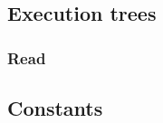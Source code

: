 \documentclass[11pt]{article}
\begin{document}
\hypertarget{execution-trees}{%
\subsection{Execution trees}\label{execution-trees}}

\hypertarget{read}{%
\subsubsection{Read}\label{read}}


\hypertarget{constants}{%
\subsection{Constants}\label{constants}}

\end{document}
